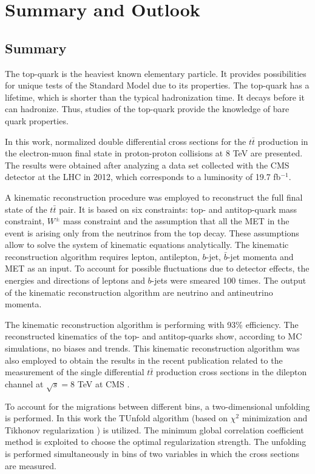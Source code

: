 \chapter{Summary and Outlook}\label{chapt:conc}

\section{Summary}

The top-quark is the heaviest known elementary particle. It provides possibilities for unique tests of the Standard
Model due to its properties. The top-quark has a lifetime, which is shorter than the typical hadronization time.
It decays before it can hadronize. Thus, studies of the top-quark provide the knowledge of bare quark 
properties.

In this work, normalized double differential cross sections for the $t\bar{t}$ production in the electron-muon final state 
in proton-proton collisions at 8 TeV are presented.
The results were obtained after analyzing a data set collected with the CMS detector at the LHC in 2012, which corresponds to a 
luminosity of 19.7 fb$^{-1}$.

A kinematic reconstruction procedure was employed to reconstruct the full final state of the $t\bar{t}$ pair. It is based on six constraints:
top- and antitop-quark mass constraint, $W^{\pm}$ mass constraint and the assumption that all the MET in the event is arising only
from the neutrinos from the top decay. These assumptions allow to solve the system of kinematic equations analytically. The kinematic reconstruction
algorithm requires lepton, antilepton, $b$-jet, $\bar{b}$-jet momenta and MET as an input. To account for possible fluctuations due 
to detector effects, the energies and directions of leptons and $b$-jets were smeared 100 times. The output of the kinematic reconstruction
algorithm are neutrino and antineutrino momenta.

The kinematic reconstruction algorithm is performing with 93\% efficiency. The reconstructed kinematics of the top- and antitop-quarks
show, according to MC simulations, no biases and trends. This kinematic reconstruction algorithm was also employed to obtain the 
results in the recent publication related
to the measurement of the single differential $t\bar{t}$ production cross sections in the dilepton channel at $\sqrt{s} = $8 TeV
at CMS \cite{Khachatryan:2015oqa}.

To account for the migrations between different bins, a two-dimensional unfolding is performed. In this work the TUnfold 
algorithm\cite{Schmitt:2012kp} (based on $\chi^{2}$ minimization and Tikhonov regularization \cite{Tikhonov:1963}) is utilized. 
The minimum global correlation coefficient method\cite{VBlobelT} is exploited to choose the 
optimal regularization strength. The unfolding is performed simultaneously in bins of two variables in which the cross
sections are measured.

